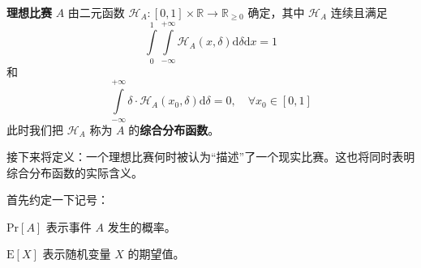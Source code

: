             \begin{definition}[理想比赛]
                \textbf{理想比赛} $A$ 由二元函数 $\mathcal{H}_A:\left[0,1\right]\times\mathbb{R}\to\mathbb{R}_{\geq 0}$ 确定，其中 $\mathcal{H}_A$ 连续且满足
                \begin{equation}
                    \int\limits_0^1\int\limits_{-\infty}^{+\infty} \mathcal{H}_A(x,\delta)\mathrm{d}\delta\mathrm{d}x=1
                    \label{formula:totalEqual1}
                \end{equation}
                和
                \begin{equation}
                    \int\limits_{-\infty}^{+\infty} \delta\cdot\mathcal{H}_A(x_0,\delta)\mathrm{d}\delta=0,\quad\forall x_0\in\left[0,1\right]
                    \label{formula:expectationEqual0}
                \end{equation}
                此时我们把 $\mathcal{H}_A$ 称为 $A$ 的\textbf{综合分布函数}。
                \label{def:idealContest}
            \end{definition}

            接下来将定义：一个理想比赛何时被认为“描述”了一个现实比赛。这也将同时表明综合分布函数的实际含义。
            
            \vspace{1.5ex}

            首先约定一下记号：

            \begin{asparaitem}
                \item $\mathrm{Pr}\left[A\right]$ 表示事件 $A$ 发生的概率。
                \item $\mathrm{E}\left[X\right]$ 表示随机变量 $X$ 的期望值。
            \end{asparaitem}

